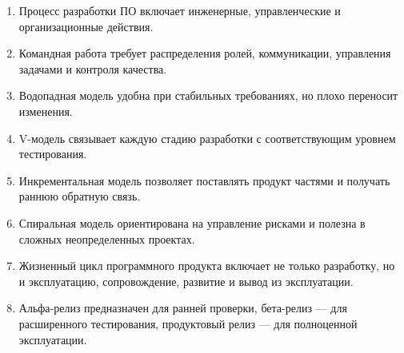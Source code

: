 \documentclass[12pt,a4paper]{article}
\begin{document}
\begin{enumerate}
    \item Процесс разработки ПО включает инженерные, управленческие и организационные действия.
    \item Командная работа требует распределения ролей, коммуникации, управления задачами и контроля качества.
    \item Водопадная модель удобна при стабильных требованиях, но плохо переносит изменения.
    \item V-модель связывает каждую стадию разработки с соответствующим уровнем тестирования.
    \item Инкрементальная модель позволяет поставлять продукт частями и получать раннюю обратную связь.
    \item Спиральная модель ориентирована на управление рисками и полезна в сложных неопределенных проектах.
    \item Жизненный цикл программного продукта включает не только разработку, но и эксплуатацию, сопровождение, развитие и вывод из эксплуатации.
    \item Альфа-релиз предназначен для ранней проверки, бета-релиз --- для расширенного тестирования, продуктовый релиз --- для полноценной эксплуатации.
\end{enumerate}
\end{document}
